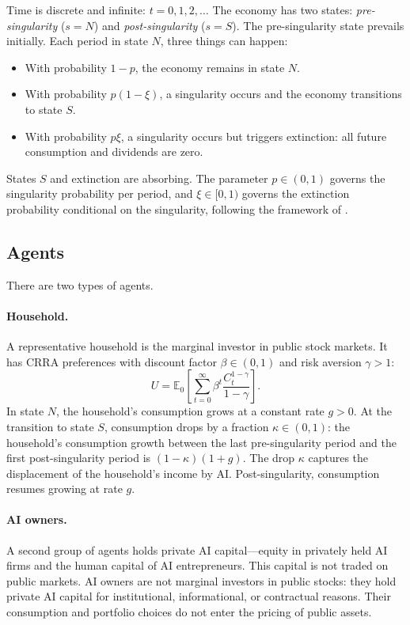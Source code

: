 \documentclass[12pt]{article}
\begin{document}
Time is discrete and infinite: $t = 0, 1, 2, \ldots$ The economy has two states: \emph{pre-singularity} ($s = N$) and \emph{post-singularity} ($s = S$). The pre-singularity state prevails initially. Each period in state $N$, three things can happen:
\begin{itemize}
  \item With probability $1 - p$, the economy remains in state $N$.
  \item With probability $p(1-\xi)$, a singularity occurs and the economy transitions to state $S$.
  \item With probability $p\xi$, a singularity occurs but triggers extinction: all future consumption and dividends are zero.
\end{itemize}
States $S$ and extinction are absorbing. The parameter $p \in (0,1)$ governs the singularity probability per period, and $\xi \in [0,1)$ governs the extinction probability conditional on the singularity, following the framework of \citet{Jones2024}.

\subsection{Agents}

There are two types of agents.

\paragraph{Household.} A representative household is the marginal investor in public stock markets. It has CRRA preferences with discount factor $\beta \in (0,1)$ and risk aversion $\gamma > 1$:
\begin{equation}
  U = \mathbb{E}_0 \left[ \sum_{t=0}^{\infty} \beta^t \frac{C_t^{1-\gamma}}{1-\gamma} \right]. \label{eq:utility} %
\end{equation}
In state $N$, the household's consumption grows at a constant rate $g > 0$. At the transition to state $S$, consumption drops by a fraction $\kappa \in (0,1)$: the household's consumption growth between the last pre-singularity period and the first post-singularity period is $(1-\kappa)(1+g)$. The drop $\kappa$ captures the displacement of the household's income by AI. Post-singularity, consumption resumes growing at rate $g$.

\paragraph{AI owners.} A second group of agents holds private AI capital---equity in privately held AI firms and the human capital of AI entrepreneurs. This capital is not traded on public markets. AI owners are not marginal investors in public stocks: they hold private AI capital for institutional, informational, or contractual reasons. Their consumption and portfolio choices do not enter the pricing of public assets.
\end{document}
